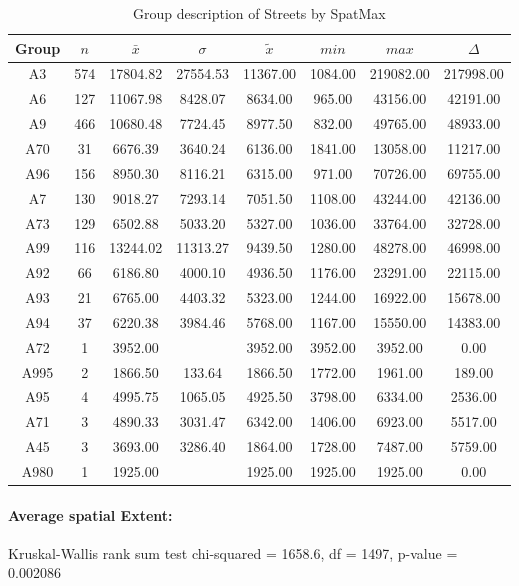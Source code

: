 \begin{table}[ht]
	\tiny
	\centering
	\begin{tabular}{c|c|c|c|c|c|c|c}
		\toprule
		Group & $n$ & $\bar{x}$ & $\sigma$ & $\tilde{x}$ & $min$ & $max$ & $\Delta$ \\  
		\midrule
		A3 & 574 & 17804.82 & 27554.53 & 11367.00 & 1084.00 & 219082.00 & 217998.00 \\ 
		A6 & 127 & 11067.98 & 8428.07 & 8634.00  & 965.00 & 43156.00 & 42191.00 \\ 
		A9 & 466 & 10680.48 & 7724.45 & 8977.50 & 832.00 & 49765.00 & 48933.00 \\ 
		A70 & 31 & 6676.39 & 3640.24 & 6136.00 & 1841.00 & 13058.00 & 11217.00 \\ 
		A96 & 156 & 8950.30 & 8116.21 & 6315.00 & 971.00 & 70726.00 & 69755.00 \\ 
		A7 & 130 & 9018.27 & 7293.14 & 7051.50 & 1108.00 & 43244.00 & 42136.00 \\ 
		A73 & 129 & 6502.88 & 5033.20 & 5327.00 & 1036.00 & 33764.00 & 32728.00 \\ 
		A99 & 116 & 13244.02 & 11313.27 & 9439.50 & 1280.00 & 48278.00 & 46998.00 \\ 
		A92 & 66 & 6186.80 & 4000.10 & 4936.50 & 1176.00 & 23291.00 & 22115.00 \\ 
		A93 & 21 & 6765.00 & 4403.32 & 5323.00 & 1244.00 & 16922.00 & 15678.00 \\ 
		A94 & 37 & 6220.38 & 3984.46 & 5768.00 & 1167.00 & 15550.00 & 14383.00 \\ 
		A72 & 1 & 3952.00 &  & 3952.00 & 3952.00 & 3952.00 & 0.00 \\ 
		A995 & 2 & 1866.50 & 133.64 & 1866.50 & 1772.00 & 1961.00 & 189.00 \\ 
		A95 & 4 & 4995.75 & 1065.05 & 4925.50 & 3798.00 & 6334.00 & 2536.00 \\ 
		A71 & 3 & 4890.33 & 3031.47 & 6342.00 & 1406.00 & 6923.00 & 5517.00 \\ 
		A45 & 3 & 3693.00 & 3286.40 & 1864.00 & 1728.00 & 7487.00 & 5759.00 \\ 
		A980 & 1 & 1925.00 &  & 1925.00 & 1925.00 & 1925.00 & 0.00 \\ 
		\bottomrule
	\end{tabular}
	\caption{Group description of Streets by SpatMax}
\end{table}

\paragraph{Average spatial Extent:}
Kruskal-Wallis rank sum test chi-squared = 1658.6, df = 1497, p-value = 0.002086

